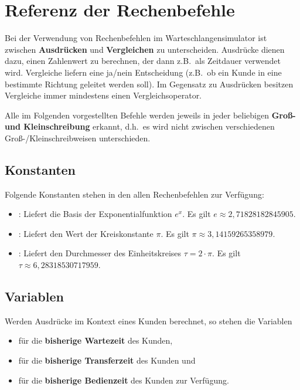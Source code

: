 \part{Referenz der Rechenbefehle}\label{part:Rechenbefehle}

Bei der Verwendung von Rechenbefehlen im Warteschlangensimulator ist zwischen
\textbf{Ausdrücken} und \textbf{Vergleichen} zu unterscheiden. Ausdrücke dienen
dazu, einen Zahlenwert zu berechnen, der dann z.B.\ als Zeitdauer verwendet wird.
Vergleiche liefern eine ja/nein Entscheidung (z.B.\ ob ein Kunde in eine bestimmte
Richtung geleitet werden soll). Im Gegensatz zu Ausdrücken besitzen Vergleiche immer
mindestens einen Vergleichsoperator.

Alle im Folgenden vorgestellten Befehle werden jeweils in jeder beliebigen
\textbf{Groß- und Kleinschreibung} erkannt, d.h.\ es wird nicht zwischen
verschiedenen Groß-/Kleinschreibweisen unterschieden.



\chapter{Konstanten}

Folgende Konstanten stehen in den allen Rechenbefehlen zur Verfügung:

\begin{itemize}

\item
{}: Liefert die Basis der Exponentialfunktion $e^x$. Es gilt
$e\approx 2,71828182845905$.

\item
{}: Liefert den Wert der Kreiskonstante $\pi$. Es gilt
$\pi\approx 3,14159265358979$.

\item
{}: Liefert den Durchmesser des Einheitskreises $\tau=2\cdot\pi$. Es gilt
$\tau\approx 6,28318530717959$.

\end{itemize}



\chapter{Variablen}

Werden Ausdrücke im Kontext eines Kunden berechnet, so stehen die Variablen
\begin{itemize}
\item
{} für die \textbf{bisherige Wartezeit} des Kunden,
\item
{} für die \textbf{bisherige Transferzeit} des Kunden und
\item
{} für die \textbf{bisherige Bedienzeit} des Kunden zur Verfügung.
\end{itemize}

